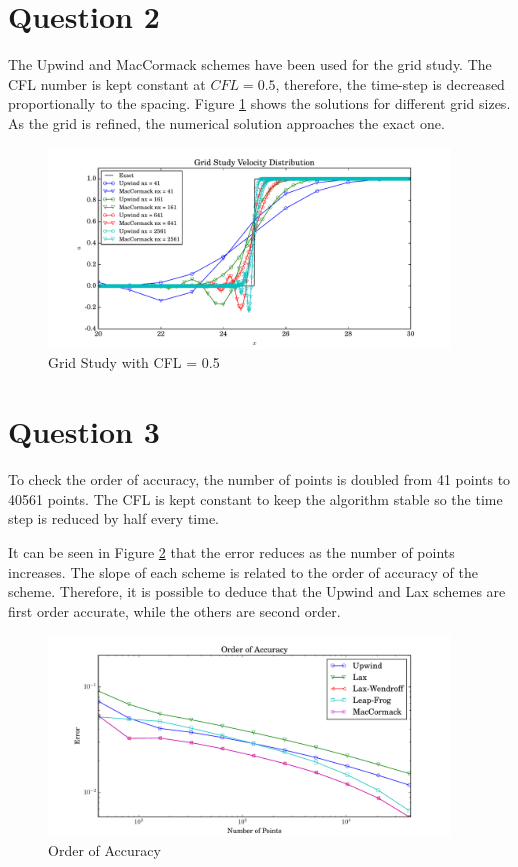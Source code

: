 \documentclass[letterpaper,12pt,]{article}
\begin{document}
\newpage
\section*{Question 2}

The Upwind and MacCormack schemes have been used for the grid study.
The CFL number is kept constant at $CFL = 0.5$, therefore, the time-step is decreased proportionally to the spacing.
Figure \ref{fig:q2} shows the solutions for different grid sizes.
As the grid is refined, the numerical solution approaches the exact one. 
\begin{figure}[!h]
    \centering
    \includegraphics[width = 0.95\textwidth]{./Figures/q2}
    \caption{Grid Study with CFL = 0.5}
    \label{fig:q2}
\end{figure}

\newpage
\section*{Question 3}

To check the order of accuracy, the number of points is doubled from 41 points to 40561 points.
The CFL is kept constant to keep the algorithm stable so the time step is reduced by half every time.

It can be seen in Figure \ref{fig:q3} that the error reduces as the number of points increases.
The slope of each scheme is related to the order of accuracy of the scheme. 
Therefore, it is possible to deduce that the Upwind and Lax schemes are first order accurate, while the others are second order.

\begin{figure}[!h]
    \centering
    \includegraphics[width = 0.95\textwidth]{./Figures/q3}
    \caption{Order of Accuracy}
    \label{fig:q3}
\end{figure}
\end{document}
